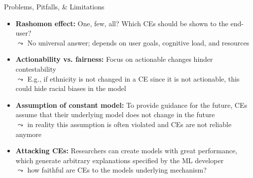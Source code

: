 \documentclass[10pt,compress,t,notes=noshow, xcolor=table]{beamer}
\begin{document}
\begin{frame}{Problems, Pitfalls, \& Limitations}
\begin{itemize}[<+->]
    \item \textbf{Rashomon effect:} One, few, all? Which CEs should be shown to the end-user?\\
    $\leadsto$ No universal answer; depends on user goals, cognitive load, and resources
    \item \textbf{Actionability vs. fairness:} Focus on actionable changes hinder contestability\\
$\leadsto$ E.g., if ethnicity is not changed in a CE since it is not actionable, this could hide racial biases in the model

    \item \textbf{Assumption of constant model:} To provide guidance for the future, CEs assume that their underlying model does not change in the future\\
    $\leadsto$ in reality this assumption is often violated and CEs are not reliable anymore 
    \item \textbf{Attacking CEs:} Researchers can create models with great performance, which generate arbitrary explanations specified by the ML developer\\
    $\leadsto$ how faithful are CEs to the models underlying mechanism?
\end{itemize}


\end{frame}
\end{document}

